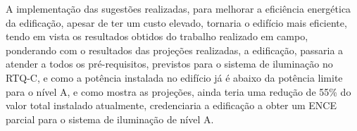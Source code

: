 A implementação das sugestões realizadas, para melhorar a eficiência energética da edificação, apesar de ter um custo elevado, tornaria o edifício mais eficiente, tendo em vista os resultados obtidos do trabalho realizado em campo, ponderando com o resultados das projeções realizadas, a edificação, passaria a atender a todos os pré-requisitos, previstos para o sistema de iluminação no RTQ-C, e como a potência instalada no edifício já é abaixo da potência limite para o nível A, e como mostra as projeções, ainda teria uma redução de 55\% do valor total instalado atualmente, credenciaria a edificação a obter um ENCE parcial para o sistema de iluminação de nível A.



















